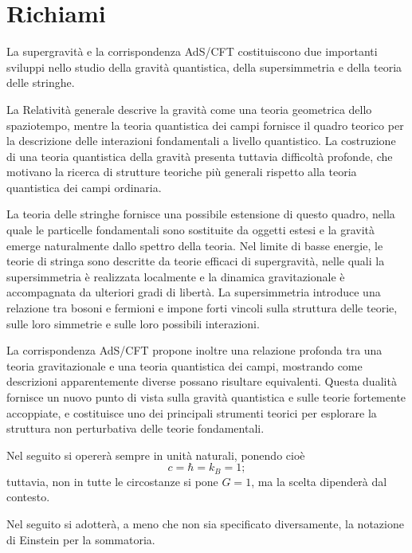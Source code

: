 \chapter{Richiami}
La supergravità e la corrispondenza AdS/CFT costituiscono due importanti sviluppi nello studio della gravità quantistica, della supersimmetria e della teoria delle stringhe.

La Relatività generale descrive la gravità come una teoria geometrica dello spaziotempo, mentre la teoria quantistica dei campi fornisce il quadro teorico per la descrizione delle interazioni fondamentali a livello quantistico. La costruzione di una teoria quantistica della gravità presenta tuttavia difficoltà profonde, che motivano la ricerca di strutture teoriche più generali rispetto alla teoria quantistica dei campi ordinaria.

La teoria delle stringhe fornisce una possibile estensione di questo quadro, nella quale le particelle fondamentali sono sostituite da oggetti estesi e la gravità emerge naturalmente dallo spettro della teoria. Nel limite di basse energie, le teorie di stringa sono descritte da teorie efficaci di supergravità, nelle quali la supersimmetria è realizzata localmente e la dinamica gravitazionale è accompagnata da ulteriori gradi di libertà. La supersimmetria introduce una relazione tra bosoni e fermioni e impone forti vincoli sulla struttura delle teorie, sulle loro simmetrie e sulle loro possibili interazioni.

La corrispondenza AdS/CFT propone inoltre una relazione profonda tra una teoria gravitazionale e una teoria quantistica dei campi, mostrando come descrizioni apparentemente diverse possano risultare equivalenti. Questa dualità fornisce un nuovo punto di vista sulla gravità quantistica e sulle teorie fortemente accoppiate, e costituisce uno dei principali strumenti teorici per esplorare la struttura non perturbativa delle teorie fondamentali.

\begin{notz}
Nel seguito si opererà sempre in unità naturali, ponendo cioè 
\begin{equation}
    c = \hbar = k_B = 1;
\end{equation}
tuttavia, non in tutte le circostanze si pone $G = 1$, ma la scelta dipenderà dal contesto.
\end{notz}
\begin{notz}
    Nel seguito si adotterà, a meno che non sia specificato diversamente, la notazione di Einstein per la sommatoria.
\end{notz}

